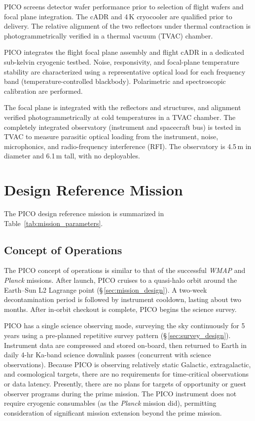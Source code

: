 PICO screens detector wafer performance prior to selection of
flight wafers and focal plane integration. The cADR and 4\,K
cryocooler are qualified prior to delivery. The relative alignment
of the two reflectors under thermal contraction is
photogrammetrically verified in a thermal vacuum (TVAC) chamber.

PICO integrates the flight focal plane assembly and flight cADR in
a dedicated sub-kelvin cryogenic testbed. Noise, responsivity, and focal-plane
temperature stability are characterized using a representative
optical load for each frequency band (temperature-controlled
blackbody). Polarimetric and spectroscopic calibration are
performed.

The focal plane is integrated with the reflectors and structures, and
alignment verified photogrammetrically at cold temperatures in a TVAC
chamber.  The completely integrated observatory (instrument and
spacecraft bus) is tested in TVAC to measure parasitic optical loading
from the instrument, noise, microphonics, and radio-frequency
interference (RFI). The observatory is 4.5\,m in diameter and 6.1\,m
tall, with no deployables.

\section{Design Reference Mission}
\label{sec:design_reference} %
The PICO design reference mission is summarized in Table~\ref{tab:mission_parameters}.

\subsection{Concept of Operations}
\label{sec:operations} %

The PICO concept of operations is similar to that of the successful
\textit{WMAP} \citep{Bennett2003} and \textit{Planck} \citep{Tauber2010} missions. After launch,
PICO cruises to a quasi-halo orbit around the Earth--Sun L2 Lagrange point
(\S\,\ref{sec:mission_design}). A two-week decontamination period is followed by
instrument cooldown, lasting about two months. After in-orbit checkout is complete, PICO begins
the science survey.

PICO has a single science observing mode, surveying the sky
continuously for 5 years using a pre-planned repetitive survey pattern
(\S\,\ref{sec:survey_design}). Instrument data are compressed and stored on-board, then
returned to Earth in daily 4-hr Ka-band science downlink passes
(concurrent with science observations). Because PICO is observing
relatively static Galactic, extragalactic, and cosmological targets,
there are no requirements for time-critical observations or data
latency. Presently, there are no plans for targets of opportunity or
guest observer programs during the prime mission. The PICO instrument
does not require cryogenic consumables (as the \textit{Planck} mission did),
permitting consideration of significant mission extension beyond the prime
mission.


